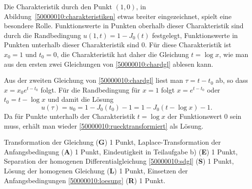 \begin{diskussion}
Die Charakteristik durch den Punkt $(1,0)$, in Abildung~\ref{50000010:charakteristiken} etwas breiter eingezeichnet, spielt eine besondere Rolle.
Funktionswerte in Punkten oberhalb dieser Charakteristik sind durch die 
Randbedingung $u(1,t)=1-J_0(t)$ festgelegt, Funktionswerte in Punkten
unterhalb dieser Charakteristik sind $0$.
Für diese Charakteristik ist $x_0=1$ und $t_0=0$, die Charakteristik
hat daher die Gleichung $t=\log x$, wie man aus den ersten zwei Gleichungen
von \eqref{50000010:chardgl} ablesen kann.

Aus der zweiten Gleichung von \eqref{50000010:chardgl}
liest man $\tau=t-t_0$ ab, so dass 
$x=x_0e^{t-t_0}$ folgt.
Für die Randbedingung für $x=1$ folgt $x=e^{t-t_0}$
oder $t_0=t-\log x$ und damit die Lösung 
\[
u(\tau)=u_0=1-J_0(t_0)-1=1-J_0(t-\log x)-1.
\]
Da für Punkte unterhalb der Charakteristik $t=\log x$ der Funktionswert $0$
sein muss, erhält man wieder \eqref{50000010:ruecktransformiert} als Lösung.
\end{diskussion}

\begin{bewertung}
Transformation der Gleichung ({\bf G}) 1 Punkt,
Laplace-Transformation der Anfangsbedingung ({\bf A}) 1 Punkt,
Eindeutigkeit in Teilaufgabe b) ({\bf E}) 1 Punkt,
Separation der homogenen Differentialgleichung \eqref{50000010:sdgl}
({\bf S}) 1 Punkt,
Lösung der homogenen Gleichung ({\bf L}) 1 Punkt,
Einsetzen der Anfangsbedingungen \eqref{50000010:loesung} ({\bf R}) 1 Punkt.
\end{bewertung}



